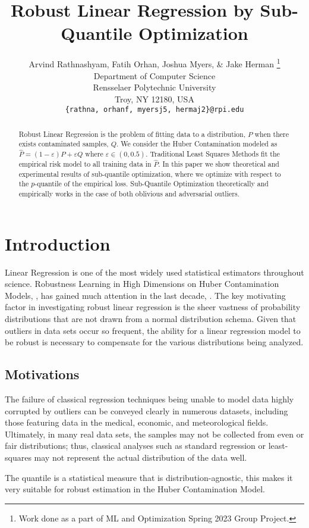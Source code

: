\documentclass{article} %
\title{Robust Linear Regression by Sub-Quantile Optimization}
\author{Arvind Rathnashyam, Fatih Orhan, Joshua Myers, \& Jake Herman  \thanks{ Work done as a part of ML and Optimization Spring 2023 Group Project.} \\
	Department of Computer Science\\
	Rensselaer Polytechnic University\\
	Troy, NY 12180, USA \\
	\texttt{\{rathna, orhanf, myersj5, hermaj2\}@rpi.edu} \\
}
\begin{document}
	
	\maketitle
	
	\begin{abstract}
		Robust Linear Regression is the problem of fitting data to a distribution, $P$ when there exists contaminated samples, $Q$. We consider the Huber Contamination modeled as $\hat{P} = (1-\varepsilon)P + \varepsilon Q$ where $\varepsilon \in (0,0.5)$. Traditional Least Squares Methods fit the empirical risk model to all training data in $\displaystyle \hat{P}$. In this paper we show theoretical and experimental results of sub-quantile optimization, where we optimize with respect to the $p$-quantile of the empirical loss. Sub-Quantile Optimization theoretically and empirically works in the case of both oblivious and adversarial outliers. 
	\end{abstract}
	
	\section{Introduction}
	
	Linear Regression is one of the most widely used statistical estimators throughout science. Robustness Learning in High Dimensions on Huber Contamination Models, \cite{Huber2009}, has gained much attention in the last decade, \cite{Diakonikolas2019RecentAI}. The key motivating factor in investigating robust linear regression is the sheer vastness of probability distributions that are not drawn from a normal distribution schema. Given that outliers in data sets occur so frequent, the ability for a linear regression model to be robust is necessary to compensate for the various distributions being analyzed. 
	\subsection{Motivations}
	The failure of classical regression techniques being unable to model data highly corrupted by outliers can be conveyed clearly in numerous datasets, including those featuring data in the medical, economic, and meteorological fields. Ultimately, in many real data sets, the samples may not be collected from even or fair distributions; thus, classical analyses such as standard regression or least-squares may not represent the actual distribution of the data well. 
	
	The quantile is a statistical measure that is distribution-agnostic, this makes it very suitable for robust estimation in the Huber Contamination Model. 
	
\end{document}
